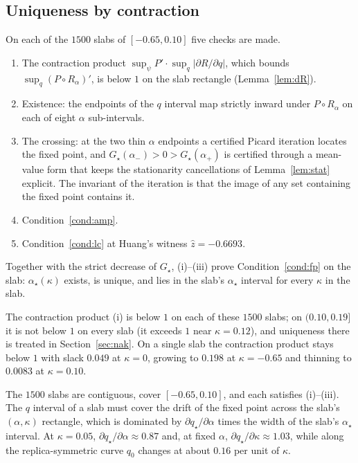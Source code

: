 \documentclass[11pt]{article}
\theoremstyle{remark}
\begin{document}
\subsection{Uniqueness by contraction}\label{sec:contraction}

On each of the $1500$ slabs of $[-0.65,0.10]$ five checks are made.
\begin{enumerate}
\item[(i)] The contraction product
$\sup_\psi P'\cdot\sup_q|\partial R/\partial q|$, which bounds
$\sup_q(P\circ R_\alpha)'$, is below $1$ on the slab rectangle
(Lemma~\ref{lem:dR}).
\item[(ii)] Existence: the endpoints of the $q$ interval map strictly inward
under $P\circ R_\alpha$ on each of eight $\alpha$ sub-intervals.
\item[(iii)] The crossing: at the two thin $\alpha$ endpoints a certified
Picard iteration locates the fixed point, and
$G_\star(\alpha_-)>0>G_\star(\alpha_+)$ is certified through a
mean-value form that keeps the stationarity cancellations of
Lemma~\ref{lem:stat} explicit.  The invariant of the iteration is that the
image of any set containing the fixed point contains it.
\item[(iv)] Condition~\ref{cond:amp}.
\item[(v)] Condition~\ref{cond:lc} at Huang's witness $\hat z=-0.6693$.
\end{enumerate}
Together with the strict decrease of
$G_\star$, (i)--(iii) prove Condition~\ref{cond:fp} on
the slab: $\alpha_\star(\kappa)$ exists, is unique, and lies in the
slab's $\alpha_\star$ interval for every $\kappa$ in the slab.

The contraction product (i) is below $1$ on each of these $1500$
slabs; on $(0.10,0.19]$ it is not below $1$ on every slab (it
exceeds $1$ near $\kappa=0.12$), and uniqueness there is treated in
Section~\ref{sec:nak}.  On a single slab
the contraction product stays below $1$ with slack
$0.049$ at $\kappa=0$, growing to $0.198$ at $\kappa=-0.65$ and
thinning to $0.0083$ at $\kappa=0.10$.

The $1500$ slabs are contiguous, cover $[-0.65,0.10]$, and each
satisfies (i)--(iii).  The $q$ interval of a slab must cover the
drift of the fixed point across the slab's $(\alpha,\kappa)$
rectangle, which is dominated by $\partial q_\star/\partial
\alpha$ times the width of the slab's $\alpha_\star$ interval.  At
$\kappa=0.05$, $\partial q_\star/\partial\alpha\approx0.87$ and, at fixed
$\alpha$, $\partial q_\star/\partial\kappa\approx1.03$, while along the
replica-symmetric curve $q_0$ changes at about $0.16$ per unit of $\kappa$.
\end{document}
